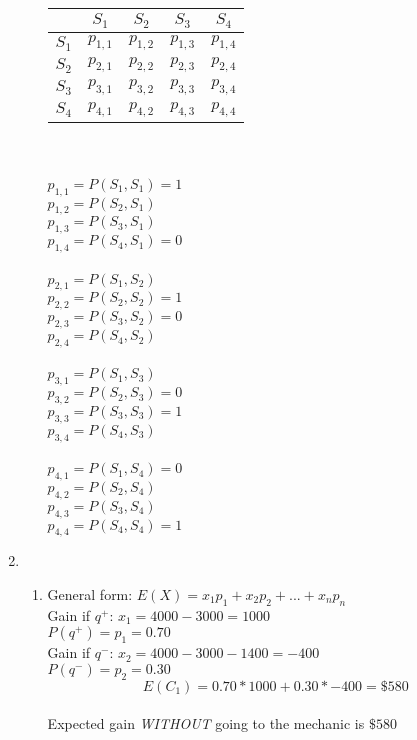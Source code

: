 \documentclass[12pt,a4paper]{report}
\begin{document}
\begin{enumerate}
\begin{enumerate}
	\begin{tabular}{ c | c | c | c | c |}
  	& $S_1$ & $S_2$ & $S_3$ & $S_4$\\ \hline
	$S_1$ & $p_{1,1}$ & $p_{1,2}$ & $p_{1,3}$ & $p_{1,4}$ \\ \hline
	$S_2$ & $p_{2,1}$ & $p_{2,2}$ & $p_{2,3}$ & $p_{2,4}$ \\ \hline
	$S_3$ & $p_{3,1}$ & $p_{3,2}$ & $p_{3,3}$ & $p_{3,4}$ \\ \hline
	$S_4$ & $p_{4,1}$ & $p_{4,2}$ & $p_{4,3}$ & $p_{4,4}$ \\ \hline
	\end{tabular}\\
	\\$p_{1,1} = P(S_1,S_1) = 1$\\
	$p_{1,2} = P(S_2,S_1)$\\
	$p_{1,3} = P(S_3,S_1)$\\
	$p_{1,4} = P(S_4,S_1) = 0$\\
	\\$p_{2,1} = P(S_1,S_2)$\\
	$p_{2,2} = P(S_2,S_2) = 1$\\
	$p_{2,3} = P(S_3,S_2) = 0$\\
	$p_{2,4} = P(S_4,S_2)$\\
	\\$p_{3,1} = P(S_1,S_3)$\\
	$p_{3,2} = P(S_2,S_3) = 0$\\
	$p_{3,3} = P(S_3,S_3) = 1$\\
	$p_{3,4} = P(S_4,S_3)$\\
	\\$p_{4,1} = P(S_1,S_4) = 0$\\
	$p_{4,2} = P(S_2,S_4)$\\
	$p_{4,3} = P(S_3,S_4)$\\
	$p_{4,4} = P(S_4,S_4) = 1$\\
	
	
\end{enumerate}

\pagebreak
\item
\begin{enumerate}
	\item
	General form: $E(X) = x_1p_1 + x_2p_2 + ... + x_np_n$\\
	Gain if $q^+$: $x_1 = 4000 - 3000 = 1000$\\
	$P(q^+) = p_1 = 0.70$\\
	Gain if $q^-$: $x_2 = 4000 - 3000 - 1400 = -400$\\
	$P(q^-)  = p_2 = 0.30$\\
	\[E(C_{1}) = 0.70*1000 + 0.30*-400 = \$580\]\\
	Expected gain \textit{WITHOUT} going to the mechanic is $\$580$\\
	

\end{enumerate}
\end{enumerate}
\end{document}
